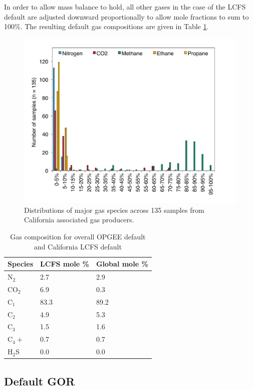 \documentclass[11pt]{report}
\begin{document}
In order to allow mass balance to hold, all other gases in the case of the LCFS default are adjusted downward proportionally to allow mole fractions to sum to 100\%. The resulting default gas compositions are given in Table \ref{tab:gas_composition}.


\begin{figure}
\includegraphics[width=0.8\columnwidth]{images/gas_comp_major.pdf}
\caption{Distributions of major gas species across 135 samples from California associated gas producers.}
\label{fig:gas_comp_major}
\end{figure}

\begin{table}
\begin{scriptsize}
\caption{Gas composition for overall OPGEE default and California LCFS default}
\label{tab:gas_composition}
\begin{tabular*}{0.5\columnwidth}{p{}p{}p{}}
\toprule
Species & LCFS mole \% & Global mole \%  \\
\midrule
N$_2$	&2.7		& 2.9 \\
CO$_2$	&6.9		& 0.3 \\
C$_1$	&83.3	& 89.2 \\
C$_2$	&4.9		& 5.3 \\
C$_3$	&1.5		& 1.6 \\
C$_4+$	&0.7		& 0.7 \\
H$_2$S	&0.0		& 0.0 \\
\bottomrule
\end{tabular*}
\end{scriptsize}
\end{table}

\subsection{Default GOR} \label{sec:GOR_default}
\end{document}
